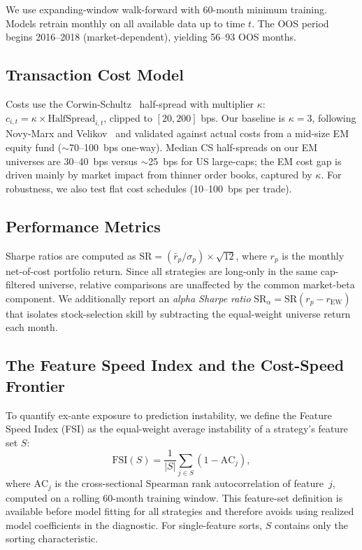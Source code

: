 \documentclass[sigconf,review,anonymous,balance=false]{acmart}
\begin{document}
We use expanding-window walk-forward with 60-month minimum training.
Models retrain monthly on all available data up to time $t$. The OOS
period begins 2016--2018 (market-dependent), yielding 56--93 OOS months.

\subsection{Transaction Cost Model}

Costs use the Corwin-Schultz~\cite{corwinschultz2012} half-spread with
multiplier $\kappa$: $c_{i,t} = \kappa \times \text{HalfSpread}_{i,t}$,
clipped to $[20, 200]$ bps. Our baseline is $\kappa = 3$, following
Novy-Marx and Velikov~\cite{novymarx2016taxonomy} and validated against
actual costs from a mid-size EM equity fund (${\sim}$70--100~bps one-way).
Median CS half-spreads on our EM universes are 30--40~bps versus
${\sim}$25~bps for US large-caps; the EM cost gap is driven mainly by
market impact from thinner order books, captured by $\kappa$. For
robustness, we also test flat cost schedules (10--100~bps per trade).

\subsection{Performance Metrics}

Sharpe ratios are computed as $\text{SR} = (\bar{r}_p / \sigma_p)
\times \sqrt{12}$, where $r_p$ is the monthly net-of-cost portfolio
return. Since all strategies are long-only in the same cap-filtered
universe, relative comparisons are unaffected by the common
market-beta component. We additionally report an \emph{alpha Sharpe
ratio} $\text{SR}_\alpha = \text{SR}(r_p - r_{\text{EW}})$ that
isolates stock-selection skill by subtracting the equal-weight universe
return each month.

\subsection{The Feature Speed Index and the Cost-Speed Frontier}
\label{sec:fsi_method}

To quantify ex-ante exposure to prediction instability, we define the
Feature Speed Index (FSI) as the equal-weight average instability of a
strategy's feature set $S$:
\begin{equation}
    \text{FSI}(S) = \frac{1}{|S|}\sum_{j \in S} (1 - \text{AC}_j),
\label{eq:fsi}
\end{equation}
where $\text{AC}_j$ is the cross-sectional Spearman rank autocorrelation
of feature~$j$, computed on a rolling 60-month training window. This
feature-set definition is available before model fitting for all strategies
and therefore avoids using realized model coefficients in the diagnostic.
For single-feature sorts, $S$ contains only the sorting characteristic.
\end{document}
